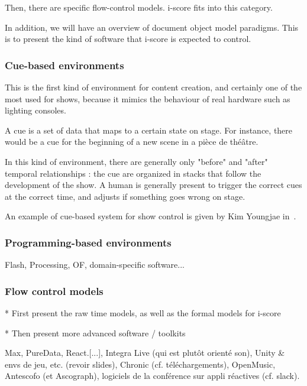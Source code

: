 \documentclass{sigchi}
\begin{document}
Then, there are specific flow-control models. i-score fits into this category.

In addition, we will have an overview of document object model paradigms. This is to present the kind of software that i-score is expected to control. %

\subsubsection{Cue-based environments}
This is the first kind of environment for content creation, and certainly one of the most used for shows, because it mimics the behaviour of real hardware such as lighting consoles.

A cue is a set of data that maps to a certain state on stage. For instance, there would be a cue for the beginning of a new scene in a pièce de théâtre.

In this kind of environment, there are generally only "before" and "after" temporal relationships : the cue are organized in stacks that follow the development of the show. A human is generally present to trigger the correct cues at the correct time, and adjusts if something goes wrong on stage.

An example of cue-based system for show control is given by Kim Youngjae in~\cite{kim_unified_2013}.

\subsubsection{Programming-based environments}
Flash, Processing, OF, domain-specific software...

\subsubsection{Flow control models}

* First present the raw time models, as well as the formal models for i-score

* Then present more advanced software / toolkits


Max, PureData, React.[...], Integra Live (qui est plutôt orienté son), Unity \& envs de jeu, etc. (revoir slides), Chronic (cf. téléchargements), OpenMusic, Antescofo (et Ascograph), logiciels de la conférence sur appli réactives (cf. slack).
\end{document}
